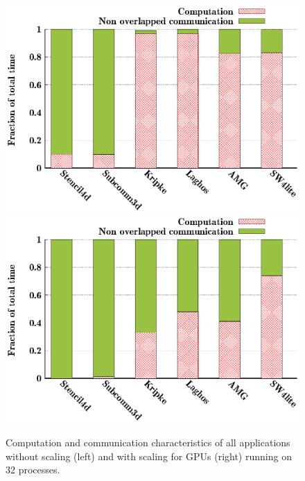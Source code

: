 \FloatBarrier
\begin{figure}[!htbp]
  \centering
  \includegraphics[width=0.8\columnwidth]{figure/val/mpi-scaled.eps}
  \includegraphics[width=0.8\columnwidth]{figure/val/mpi.eps}
  \caption{Computation and communication characteristics of all applications without scaling (left) and with scaling for GPUs (right)
running on 32 processes.} 
  \label{fig:trace_profile}
\end{figure}
\FloatBarrier
